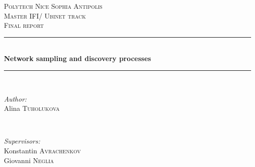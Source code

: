 \documentclass[12pt]{report}
\begin{document}
\begin{titlepage}

\newcommand{\HRule}{\rule{\linewidth}{0.5mm}} %

\center %

\textsc{\LARGE Polytech Nice Sophia Antipolis}\\[1.5cm] %
\textsc{\Large Master IFI/ Ubinet track}\\[0.5cm] %
\textsc{\large Final report}\\[0.5cm] %


\HRule \\[0.4cm]
{ \huge \bfseries Network sampling and discovery processes}\\[0.4cm] %
\HRule \\[1.5cm]
 

\begin{minipage}{0.4\textwidth}
\begin{flushleft} \large
\emph{Author:}\\
Alina \textsc{Tuholukova} %
\end{flushleft}
\end{minipage}
~
\begin{minipage}{0.5\textwidth}
\begin{flushright} \large
\emph{Supervisors:} \\
Konstantin \textsc{Avrachenkov} \\%
Giovanni \textsc{Neglia} %
\end{flushright}
\end{minipage}\\[9cm]



\end{titlepage}
\end{document}
